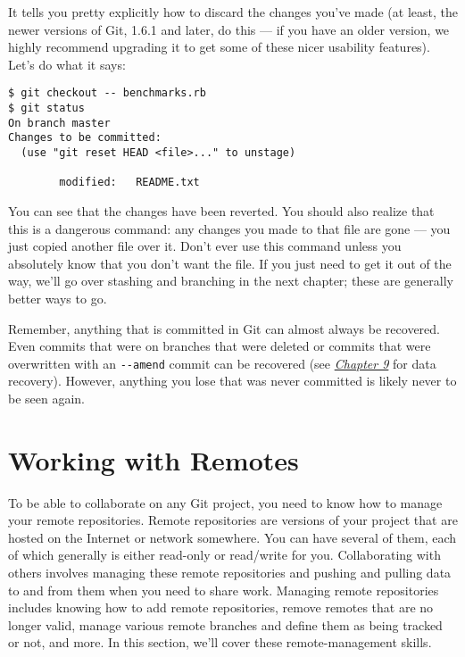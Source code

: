 \documentclass[a4paper]{book}
\newcommand{\prechap}{Chapter }
\newcommand{\postchap}{}
\newcommand{\chapref}[1]{\hyperref[chap:#1]{\prechap #1\postchap}}
\begin{document}
It tells you pretty explicitly how to discard the changes you've made (at least, the newer versions of Git, 1.6.1 and later, do this --- if you have an older version, we highly recommend upgrading it to get some of these nicer usability features). Let's do what it says:

\begin{shaded}\begin{verbatim}
$ git checkout -- benchmarks.rb
$ git status
On branch master
Changes to be committed:
  (use "git reset HEAD <file>..." to unstage)

        modified:   README.txt
\end{verbatim}\end{shaded}

You can see that the changes have been reverted. You should also realize that this is a dangerous command: any changes you made to that file are gone --- you just copied another file over it. Don't ever use this command unless you absolutely know that you don't want the file. If you just need to get it out of the way, we'll go over stashing and branching in the next chapter; these are generally better ways to go.

Remember, anything that is committed in Git can almost always be recovered. Even commits that were on branches that were deleted or commits that were overwritten with an \texttt{-{}-amend} commit can be recovered (see \emph{\chapref{9}} for data recovery). However, anything you lose that was never committed is likely never to be seen again.

\section{Working with Remotes}\label{working-with-remotes}

To be able to collaborate on any Git project, you need to know how to manage your remote repositories. Remote repositories are versions of your project that are hosted on the Internet or network somewhere. You can have several of them, each of which generally is either read-only or read/write for you. Collaborating with others involves managing these remote repositories and pushing and pulling data to and from them when you need to share work. Managing remote repositories includes knowing how to add remote repositories, remove remotes that are no longer valid, manage various remote branches and define them as being tracked or not, and more. In this section, we'll cover these remote-management skills.
\end{document}
